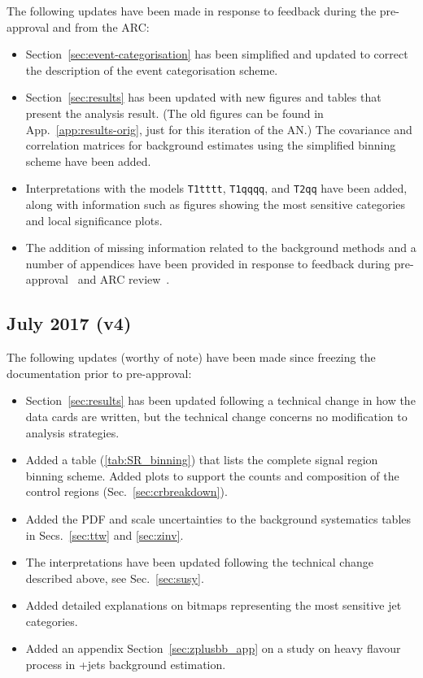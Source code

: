 The following updates have been made in response to feedback during
the pre-approval and from the ARC:
\begin{itemize}
\item Section~\ref{sec:event-categorisation} has been simplified and
  updated to correct the description of the event categorisation
  scheme.
\item Section~\ref{sec:results} has been updated with new figures and
  tables that present the analysis result. (The old figures can be
  found in App.~\ref{app:results-orig}, just for this iteration of the
  AN.)  The covariance and correlation matrices for background
  estimates using the simplified binning scheme have been added.
\item Interpretations with the models \verb!T1tttt!, \verb!T1qqqq!,
  and \verb!T2qq!  have been added, along with information such as
  figures showing the most sensitive categories and local significance
  plots.
\item The addition of missing information related to the background
  methods and a number of appendices have been provided in response to
  feedback during pre-approval~\cite{preapp} and ARC
  review~\cite{arcreviewowen, arcreviewnadja}. 
\end{itemize}

\subsection{July 2017 (v4)}

The following updates (worthy of note) have been made since freezing
the documentation prior to pre-approval:
\begin{itemize}
\item Section~\ref{sec:results} has been updated following a technical change 
  in how the data cards are written, but the technical change concerns 
  no modification to analysis strategies.
\item Added a table (\ref{tab:SR_binning}) that lists the complete
  signal region binning scheme. Added plots to support the counts and
  composition of the control regions (Sec.~\ref{sec:crbreakdown}).
\item Added the PDF and scale uncertainties to the background
  systematics tables in Secs.~\ref{sec:ttw} and \ref{sec:zinv}.
\item The interpretations have been updated following the technical
  change described above, see Sec.~\ref{sec:susy}.
\item Added detailed explanations on bitmaps representing the most sensitive 
  jet categories.
\item Added an appendix Section~\ref{sec:zplusbb_app} on a study on heavy 
  flavour process in \znunu+jets background estimation.
\end{itemize}

